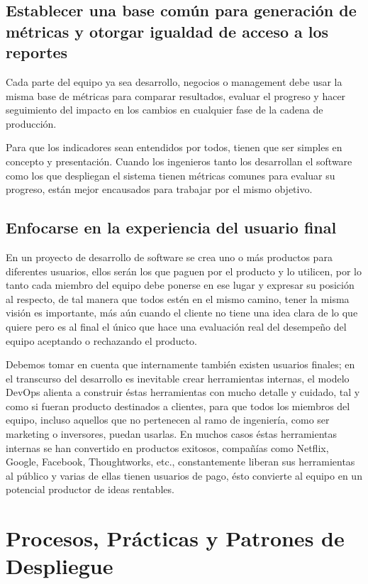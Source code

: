 \documentclass[conference]{IEEEtran}
\begin{document}
\subsection{Establecer una base común para generación de métricas y otorgar igualdad de acceso a los reportes}

Cada parte del equipo ya sea desarrollo, negocios o management debe usar la misma base de métricas para comparar resultados, evaluar el progreso y hacer seguimiento del impacto en los cambios en cualquier fase de la cadena de producción.

Para que los indicadores sean entendidos por todos, tienen que ser simples en concepto y presentación. Cuando los ingenieros tanto los desarrollan el software como los que despliegan el sistema tienen métricas comunes para evaluar su progreso, están mejor encausados para trabajar por el mismo objetivo.

\subsection{Enfocarse en la experiencia del usuario final}

En un proyecto de desarrollo de software se crea uno o más productos para diferentes usuarios, ellos serán los que paguen por el producto y lo utilicen, por lo tanto cada miembro del equipo debe ponerse en ese lugar y expresar su posición al respecto, de tal manera que todos estén en el mismo camino, tener la misma visión es importante, más aún cuando el cliente no tiene una idea clara de lo que quiere pero es al final el único que hace una evaluación real del desempeño del equipo aceptando o rechazando el producto.

Debemos tomar en cuenta que internamente también existen usuarios finales; en el transcurso del desarrollo es inevitable crear herramientas internas, el modelo DevOps alienta a construir éstas herramientas con mucho detalle y cuidado, tal y como si fueran producto destinados a clientes, para que todos los miembros del equipo, incluso aquellos que no pertenecen al ramo de ingeniería, como ser marketing o inversores, puedan usarlas. En muchos casos éstas herramientas internas se han convertido en productos exitosos, compañías como Netflix, Google, Facebook, Thoughtworks, etc., constantemente liberan sus herramientas al público y varias de ellas tienen usuarios de pago, ésto convierte al equipo en un potencial productor de ideas rentables.

\section{Procesos, Prácticas y Patrones de Despliegue}
\end{document}
